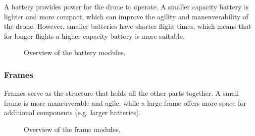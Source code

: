 \documentclass[sigconf,review]{acmart}
\begin{document}
A battery provides power for the drone to operate. 
A smaller capacity battery is lighter and more compact, which can improve the agility and maneuverability of the drone. 
However, smaller batteries have shorter flight times, which means that for longer flights a higher capacity battery is more suitable.

\begin{figure}[htbp]
    \hfill
    \hfill
    \caption{Overview of the battery modules.}
    \label{fig:batteries}
\end{figure}

\subsubsection{Frames}
\label{sec:frames}

Frames serve as the structure that holds all the other parts together. 
A small frame is more maneuverable and agile, while a large frame offers more space for additional components (e.g. larger batteries).

\begin{figure}[htbp]
    \hfill

    \caption{Overview of the frame modules.}
    \label{fig:frames}
\end{figure}
\end{document}
